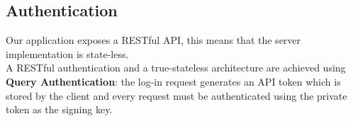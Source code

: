 \subsection{Authentication}
	Our application exposes a RESTful API, this means that the server implementation is state-less. 
	\\A RESTful authentication and a true-stateless architecture are achieved using \textbf{Query Authentication}: 
	the log-in request generates an API token which is stored by the client and every request must be authenticated using the private token as the signing key.